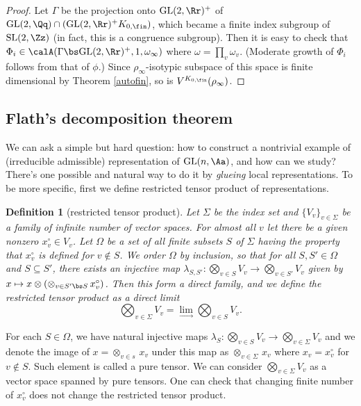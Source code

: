 \documentclass{article}
\newtheorem{definition}{Definition}[section]
\newcommand{\GL}{\mathrm{GL}}
\newcommand{\SL}{\mathrm{SL}}
\begin{document}
\begin{proof}
Let $\Gamma$ be the projection onto $\GL(2, \Rr)^{+}$ of $\GL(2, \Qq) \cap (\GL(2, \Rr)^{+}K_{0, \fin})$, which became a finite index subgroup of $\SL(2, \Zz)$ (in fact, this is a congruence subgroup). 
Then it is easy to check that $\Phi_i \in \calA(\Gamma \bs \GL(2, \Rr)^{+}, 1, \omega_{\infty})$ where $\omega = \prod_{v} \omega_{v}$. (Moderate growth of $\Phi_i$ follows from that of $\phi$.) 
Since $\rho_{\infty}$-isotypic subspace of this space is finite dimensional by Theorem \ref{autofin}, so is $V^{K_{0, \fin}}(\rho_\infty)$. 
\end{proof}










\subsection{Flath's decomposition theorem}

We can ask a simple but hard question: how to construct a nontrivial example of (irreducible admissible) representation of $\GL(n, \Aa)$, and how can we study? 
There's one possible and natural way to do it by \emph{glueing} local representations. To be more specific, first we define restricted tensor product of representations. 
\begin{definition}[restricted tensor product]
Let $\Sigma$ be the index set and  $\{V_{v}\}_{v\in \Sigma}$ be a family of infinite number of vector spaces. 
For almost all $v$ let there be a given nonzero $x_{v}^{\circ} \in V_{v}$. 
Let $\Omega$ be a set of all finite subsets $S$ of $\Sigma$ having the property that $x_{v}^{\circ}$ is defined for $v\not\in S$. 
We order $\Omega$ by inclusion, so that for all $S, S'\in \Omega$ and $S\subseteq S'$, there exists an injective map $\lambda_{S, S'} : \bigotimes_{v\in S} V_{v}  \to \bigotimes_{v\in S'} V_{v}$ given by $x\mapsto x\otimes (\otimes_{v\in S'\bs S}\,x_{v}^{\circ})$. 
Then this form a direct family, and we define the restricted tensor product as a direct limit
$$
\bigotimes_{v\in \Sigma} V_{v} = \lim_{\longrightarrow} \bigotimes_{v\in S} V_{v}.
$$
\end{definition}
For each $S\in \Omega$, we have natural injective maps $\lambda_{S} : \bigotimes_{v\in S} V_{v} \to \bigotimes_{v\in \Sigma} V_{v}$ and we denote the image of $x = \otimes_{v\in s} \, x_{v}$ under this map as $\otimes_{v\in \Sigma}\, x_{v}$ where $x_{v} = x_{v}^{\circ}$ for $v\not\in S$. 
Such element is called a pure tensor. 
We can consider $\bigotimes_{v\in \Sigma}V_{v}$ as a vector space spanned by pure tensors. 
One can check that changing finite number of $x_{v}^{\circ}$ does not change the restricted tensor product. 
\end{document}
